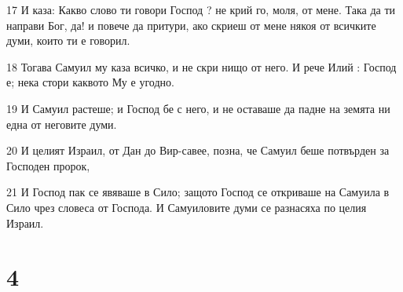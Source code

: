 \par 17 И каза: Какво слово ти говори Господ ? не крий го, моля, от мене. Така да ти направи Бог, да! и повече да притури, ако скриеш от мене някоя от всичките думи, които ти е говорил.
\par 18 Тогава Самуил му каза всичко, и не скри нищо от него. И рече Илий : Господ е; нека стори каквото Му е угодно.
\par 19 И Самуил растеше; и Господ бе с него, и не оставаше да падне на земята ни една от неговите думи.
\par 20 И целият Израил, от Дан до Вир-савее, позна, че Самуил беше потвърден за Господен пророк,
\par 21 И Господ пак се явяваше в Сило; защото Господ се откриваше на Самуила в Сило чрез словеса от Господа. И Самуиловите думи се разнасяха по целия Израил.

\chapter{4}

